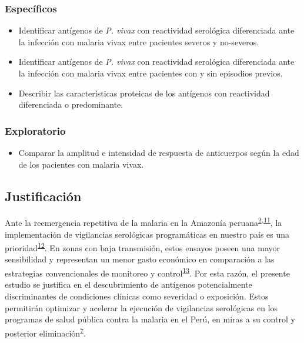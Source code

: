 \documentclass[]{article}
\providecommand{\tightlist}{%
  \setlength{\itemsep}{0pt}\setlength{\parskip}{0pt}}
\begin{document}
\subsubsection{Específicos}\label{especificos}

\begin{itemize}
\item
  Identificar antígenos de \emph{P. vivax} con reactividad serológica
  diferenciada ante la infección con malaria vivax entre pacientes
  severos y no-severos.
\item
  Identificar antígenos de \emph{P. vivax} con reactividad serológica
  diferenciada ante la infección con malaria vivax entre pacientes con y
  sin episodios previos.
\item
  Describir las características proteicas de los antígenos con
  reactividad diferenciada o predominante.
\end{itemize}

\subsubsection{Exploratorio}\label{exploratorio}

\begin{itemize}
\tightlist
\item
  Comparar la amplitud e intensidad de respuesta de anticuerpos según la
  edad de los pacientes con malaria vivax.
\end{itemize}

\subsection{Justificación}\label{justif}

Ante la reemergencia repetitiva de la malaria en la Amazonía
peruana\textsuperscript{\protect\hyperlink{ref-rosas2016peru}{2},\protect\hyperlink{ref-griffing2013history}{11}},
la implementación de vigilancias serológicas programáticas en nuestro
país es una
prioridad\textsuperscript{\protect\hyperlink{ref-hotspots2015}{12}}. En
zonas con baja transmisión, estos ensayos poseen una mayor sensibilidad
y representan un menor gasto económico en comparación a las estrategias
convencionales de monitoreo y
control\textsuperscript{\protect\hyperlink{ref-elliott2014}{13}}. Por
esta razón, el presente estudio se justifica en el descubrimiento de
antígenos potencialmente discriminantes de condiciones clínicas como
severidad o exposición. Estos permitirán optimizar y acelerar la
ejecución de vigilancias serológicas en los programas de salud pública
contra la malaria en el Perú, en miras a su control y posterior
eliminación\textsuperscript{\protect\hyperlink{ref-accelerate2016}{7}}.
\end{document}
